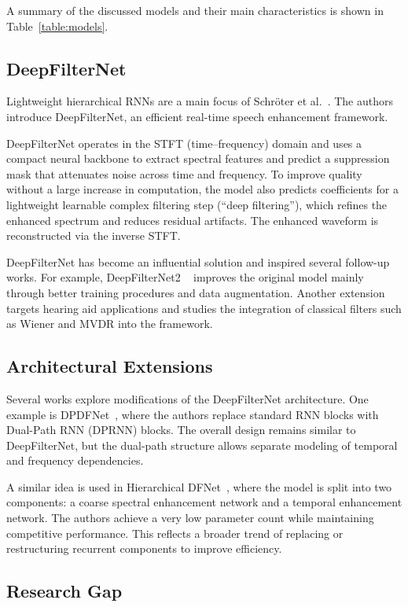 \documentclass[a4paper,12pt]{extarticle}
\begin{document}
A summary of the discussed models and their main characteristics is shown in Table~\ref{table:models}.

\subsection{DeepFilterNet}

Lightweight hierarchical RNNs are a main focus of Schr\"oter et al.~\cite{dfn}. The authors introduce DeepFilterNet,
an efficient real-time speech enhancement framework.

DeepFilterNet operates in the STFT (time--frequency) domain and uses a compact neural backbone to extract spectral
features and predict a suppression mask that attenuates noise across time and frequency. To improve quality without
a large increase in computation, the model also predicts coefficients for a lightweight learnable complex filtering
step (``deep filtering''), which refines the enhanced spectrum and reduces residual artifacts. The enhanced waveform
is reconstructed via the inverse STFT.

DeepFilterNet has become an influential solution and inspired several follow-up works. For example, DeepFilterNet2
~\cite{dfn2} improves the original model mainly through better training procedures and data augmentation. Another
extension targets hearing aid applications and studies the integration of classical filters such as Wiener and MVDR
into the framework.

\subsection{Architectural Extensions}

Several works explore modifications of the DeepFilterNet architecture. One example is DPDFNet~\cite{dpdfnet}, where
the authors replace standard RNN blocks with Dual-Path RNN (DPRNN) blocks. The overall design remains similar to
DeepFilterNet, but the dual-path structure allows separate modeling of temporal and frequency dependencies.

A similar idea is used in Hierarchical DFNet~\cite{hdfnet}, where the model is split into two components: a coarse
spectral enhancement network and a temporal enhancement network. The authors achieve a very low parameter count while
maintaining competitive performance. This reflects a broader trend of replacing or restructuring recurrent components
to improve efficiency.

\subsection{Research Gap}
\end{document}
